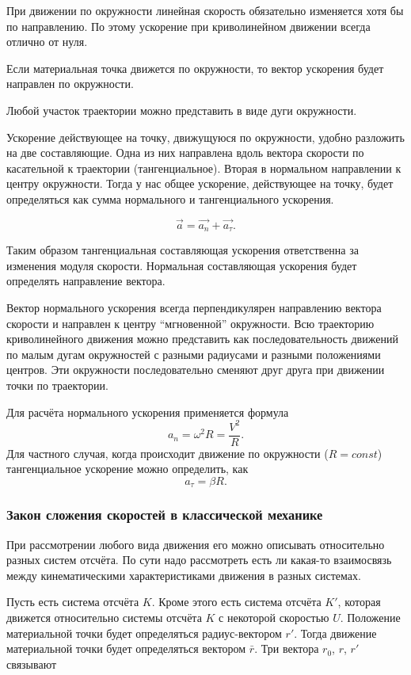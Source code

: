 При движении по окружности линейная скорость обязательно изменяется хотя бы по
направлению. По этому ускорение при криволинейном движении всегда отлично от
нуля.

Если материальная точка движется по окружности, то вектор ускорения будет
направлен по окружности.

Любой участок траектории можно представить в виде дуги окружности.

Ускорение действующее на точку, движущуюся по окружности, удобно разложить на
две составляющие. Одна из них направлена вдоль вектора скорости по касательной
к траектории (тангенциальное). Вторая в нормальном направлении к центру
окружности. Тогда у нас общее ускорение, действующее на точку, будет
определяться как сумма нормального и тангенциального ускорения.

\[
  \vec{a} = \vec{a_n} + \vec{a_\tau}
.\]

Таким образом тангенциальная составляющая ускорения ответственна за изменения
модуля скорости. Нормальная составляющая ускорения будет определять направление
вектора.

Вектор нормального ускорения всегда перпендикулярен направлению вектора
скорости и направлен к центру ``мгновенной'' окружности. Всю траекторию
криволинейного движения можно представить как последовательность движений по
малым дугам окружностей с разными радиусами и разными положениями центров. Эти
окружности последовательно сменяют друг друга при движении точки по траектории.

Для расчёта нормального ускорения применяется формула \[
  a_n = \omega^2 R = \frac{V^2 }{R}
.\] Для частного случая, когда происходит движение по окружности (\( R =
const \)) тангенциальное ускорение можно определить, как \[
  a_\tau = \beta R
.\]

\subsubsection{Закон сложения скоростей в классической механике}

При рассмотрении любого вида движения его можно описывать относительно разных
систем отсчёта. По сути надо рассмотреть есть ли какая-то взаимосвязь между
кинематическими характеристиками движения в разных системах.

Пусть есть система отсчёта \( K \). Кроме этого есть система отсчёта \( K' \),
которая движется относительно системы отсчёта \( K \) с некоторой скоростью \(
U \). Положение материальной точки будет определяться радиус-вектором \( r' \).
Тогда движение материальной точки будет определяться вектором \( \bar{r} \).
Три вектора \( r_0 \), \( r \), \( r' \) связывают

